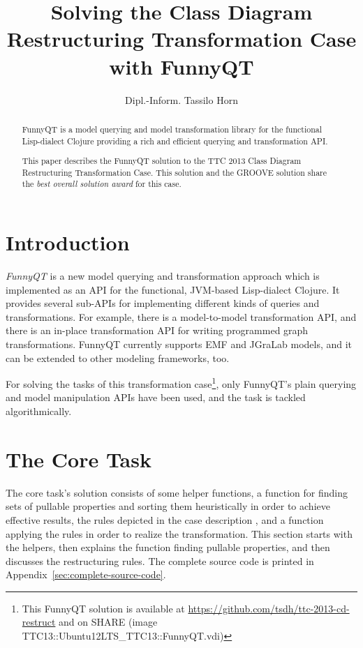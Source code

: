 \documentclass[submission]{eptcs}
\title{Solving the Class Diagram Restructuring Transformation Case with FunnyQT}
\author{Dipl.-Inform. Tassilo Horn
  \email{horn@uni-koblenz.de}
  \institute{Institute for Software Technology, University Koblenz-Landau, Germany}}
\begin{document}
\maketitle
\begin{abstract}
  FunnyQT is a model querying and model transformation library for the
  functional Lisp-dialect Clojure providing a rich and efficient querying and
  transformation API.

  This paper describes the FunnyQT solution to the TTC 2013 Class Diagram
  Restructuring Transformation Case.  This solution and the GROOVE solution
  share the \emph{best overall solution award} for this case.
\end{abstract}

\section{Introduction}
\label{sec:introduction}

\emph{FunnyQT} is a new model querying and transformation approach which is
implemented as an API for the functional, JVM-based Lisp-dialect Clojure.  It
provides several sub-APIs for implementing different kinds of queries and
transformations.  For example, there is a model-to-model transformation API,
and there is an in-place transformation API for writing programmed graph
transformations.  FunnyQT currently supports EMF and JGraLab models, and it can
be extended to other modeling frameworks, too.

For solving the tasks of this transformation case\footnote{This FunnyQT
  solution is available at \url{https://github.com/tsdh/ttc-2013-cd-restruct}
  and on SHARE (image
  \textsf{TTC13::Ubuntu12LTS\_TTC13::FunnyQT.vdi})\label{fn:github}}, only
FunnyQT's plain querying and model manipulation APIs have been used, and the
task is tackled algorithmically.


\section{The Core Task}
\label{sec:core-task}

The core task's solution consists of some helper functions, a function for
finding sets of pullable properties and sorting them heuristically in order to
achieve effective results, the rules depicted in the case description
\cite{cdrestructcasedesc}, and a function applying the rules in order to
realize the transformation.  This section starts with the helpers, then
explains the function finding pullable properties, and then discusses the
restructuring rules.  The complete source code is printed in
Appendix~\ref{sec:complete-source-code}.
\end{document}
